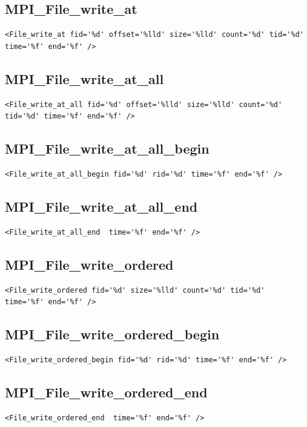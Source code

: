 \documentclass[a4paper,12pt,pdftex]{scrartcl}
\begin{document}
\subsection{MPI\_File\_write\_at}
\begin{lstlisting}
<File_write_at fid='%d' offset='%lld' size='%lld' count='%d' tid='%d' time='%f' end='%f' />
\end{lstlisting}

\subsection{MPI\_File\_write\_at\_all}
\begin{lstlisting}
<File_write_at_all fid='%d' offset='%lld' size='%lld' count='%d' tid='%d' time='%f' end='%f' />
\end{lstlisting}

\subsection{MPI\_File\_write\_at\_all\_begin}
\begin{lstlisting}
<File_write_at_all_begin fid='%d' rid='%d' time='%f' end='%f' />
\end{lstlisting}

\subsection{MPI\_File\_write\_at\_all\_end}
\begin{lstlisting}
<File_write_at_all_end  time='%f' end='%f' />
\end{lstlisting}

\subsection{MPI\_File\_write\_ordered}
\begin{lstlisting}
<File_write_ordered fid='%d' size='%lld' count='%d' tid='%d'  time='%f' end='%f' />
\end{lstlisting}

\subsection{MPI\_File\_write\_ordered\_begin}
\begin{lstlisting}
<File_write_ordered_begin fid='%d' rid='%d' time='%f' end='%f' />
\end{lstlisting}

\subsection{MPI\_File\_write\_ordered\_end}
\begin{lstlisting}
<File_write_ordered_end  time='%f' end='%f' />
\end{lstlisting}
\end{document}
